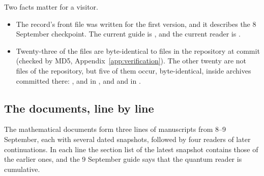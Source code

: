 Two facts matter for a visitor.
\begin{itemize}
\item The record's front file  was written for the first version, and it describes the 8 September checkpoint. The current guide is , and the current reader is .
\item Twenty-three of the files are byte-identical to files in the repository at commit  (checked by MD5, Appendix~\ref{app:verification}). The other twenty are not files of the repository, but five of them occur, byte-identical, inside archives committed there: ,  and  in , and  and  in .
\end{itemize}

\subsection{The documents, line by line}\label{ssec:lines}

The mathematical documents form three lines of manuscripts from 8--9 September, each with several dated snapshots, followed by four readers of later continuations. In each line the section list of the latest snapshot contains those of the earlier ones, and the 9 September guide says that the quantum reader is cumulative.

